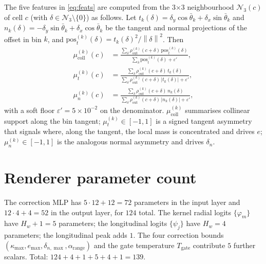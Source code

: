 \documentclass[11pt,a4paper]{article}
\newcommand{\norm}[1]{\left\lVert#1\right\rVert}
\newcommand{\abs}[1]{\left\lvert#1\right\rvert}
\begin{document}
The five features in \cref{eq:feats} are computed from the 3$\times$3 neighbourhood $\mathcal{N}_3(c)$ of cell $c$ (with $\delta \in \mathcal{N}_3 \setminus \{0\}$) as follows. Let $t_k(\delta) = \delta_y \cos\bar\theta_k + \delta_x \sin\bar\theta_k$ and $n_k(\delta) = -\delta_y \sin\bar\theta_k + \delta_x \cos\bar\theta_k$ be the tangent and normal projections of the offset in bin $k$, and $\mathrm{pos}_t^{(k)}(\delta) = t_k(\delta)^2/\norm{\delta}^2$. Then
\begin{align}
  \mu^{(k)}_{\mathrm{coll}}(c) &= \frac{\sum_\delta \rho_{\mathrm{out}}^{(k)}(c+\delta)\,\mathrm{pos}_t^{(k)}(\delta)}
                                       {\sum_\delta \mathrm{pos}_t^{(k)}(\delta) + \varepsilon'}, \\
  \mu^{(k)}_t(c) &= \frac{\sum_\delta \rho_{\mathrm{out}}^{(k)}(c+\delta)\, t_k(\delta)}
                          {\sum_\delta \rho_{\mathrm{out}}^{(k)}(c+\delta)\, \abs{t_k(\delta)} + \varepsilon'}, \\
  \mu^{(k)}_n(c) &= \frac{\sum_\delta \rho_{\mathrm{out}}^{(k)}(c+\delta)\, n_k(\delta)}
                          {\sum_\delta \rho_{\mathrm{out}}^{(k)}(c+\delta)\, \abs{n_k(\delta)} + \varepsilon'},
\end{align}
with a soft floor $\varepsilon' = 5\times 10^{-2}$ on the denominator. $\mu^{(k)}_{\mathrm{coll}}$ summarises collinear support along the bin tangent; $\mu^{(k)}_t \in [-1, 1]$ is a signed tangent asymmetry that signals where, along the tangent, the local mass is concentrated and drives $e$; $\mu^{(k)}_n \in [-1, 1]$ is the analogous normal asymmetry and drives $\delta_n$.

\section{Renderer parameter count}\label{app:render-count}

The correction MLP has $5 \cdot 12 + 12 = 72$ parameters in the input layer and $12 \cdot 4 + 4 = 52$ in the output layer, for $124$ total. The kernel radial logits $\{\varphi_m\}$ have $H_w + 1 = 5$ parameters; the longitudinal logits $\{\psi_j\}$ have $H_w = 4$ parameters; the longitudinal peak adds $1$. The four correction bounds $(\kappa_{\max}, e_{\max}, \delta_{n,\max}, \alpha_{\mathrm{range}})$ and the gate temperature $T_{\mathrm{gate}}$ contribute $5$ further scalars. Total: $124 + 4 + 1 + 5 + 4 + 1 = 139$.
\end{document}
